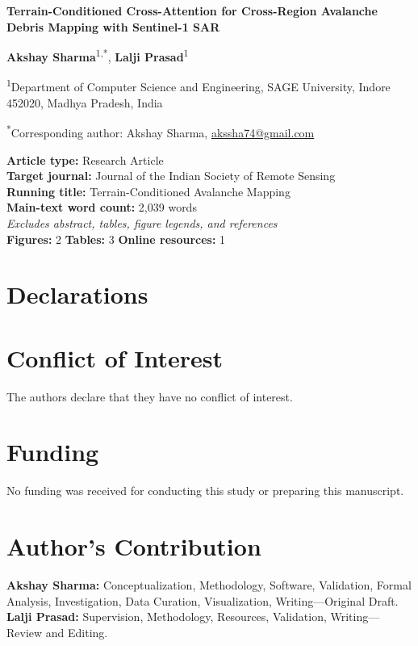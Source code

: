 \documentclass[10pt,a4paper]{article}
\begin{document}
\sloppy
\pagestyle{empty}

\begin{center}
{\Large\bfseries Terrain-Conditioned Cross-Attention for Cross-Region Avalanche Debris Mapping with Sentinel-1 SAR\par}
\vspace{0.7em}
{\large\textbf{Akshay Sharma}\textsuperscript{1,*}, \textbf{Lalji Prasad}\textsuperscript{1}\par}
\vspace{0.8em}
{\small\textsuperscript{1}Department of Computer Science and Engineering, SAGE University, Indore 452020, Madhya Pradesh, India\par}
\vspace{0.6em}
{\small\textsuperscript{*}Corresponding author: Akshay Sharma, \href{mailto:akssha74@gmail.com}{akssha74@gmail.com}\par}
\end{center}

\vspace{1.2em}
\noindent\textbf{Article type:} Research Article\\
\textbf{Target journal:} Journal of the Indian Society of Remote Sensing\\
\textbf{Running title:} Terrain-Conditioned Avalanche Mapping\\
\textbf{Main-text word count:} 2,039 words\\
\textit{Excludes abstract, tables, figure legends, and references}\\
\textbf{Figures:} 2 \qquad \textbf{Tables:} 3 \qquad \textbf{Online resources:} 1

\section*{Declarations}

\section*{Conflict of Interest}
The authors declare that they have no conflict of interest.

\section*{Funding}
No funding was received for conducting this study or preparing this manuscript.

\section*{Author's Contribution}
\noindent\textbf{Akshay Sharma:} Conceptualization, Methodology, Software, Validation, Formal Analysis, Investigation, Data Curation, Visualization, Writing---Original Draft.\\
\textbf{Lalji Prasad:} Supervision, Methodology, Resources, Validation, Writing---Review and Editing.
\end{document}
